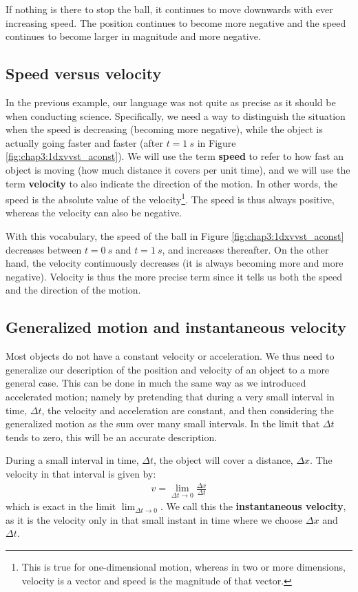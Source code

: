 If nothing is there to stop the ball, it continues to move downwards with ever increasing speed. The position continues to become more negative and the speed continues to become larger in magnitude and more negative.


\subsection{Speed versus velocity}
In the previous example, our language was not quite as precise as it should be when conducting science. Specifically, we need a way to distinguish the situation when the speed is decreasing (becoming more negative), while the object is actually going faster and faster (after $t=\SI{1}{s}$ in Figure \ref{fig:chap3:1dxvvst_aconst}). We will use the term \textbf{speed} to refer to how fast an object is moving (how much distance it covers per unit time), and we will use the term \textbf{velocity} to also indicate the direction of the motion. In other words, the speed is the absolute value of the velocity\footnote{This is true for one-dimensional motion, whereas in two or more dimensions, velocity is a vector and speed is the magnitude of that vector.}. The speed is thus always positive, whereas the velocity can also be negative.

With this vocabulary, the speed of the ball in Figure \ref{fig:chap3:1dxvvst_aconst} decreases between $t=\SI{0}{s}$ and $t=\SI{1}{s}$, and increases thereafter. On the other hand, the velocity continuously decreases (it is always becoming more and more negative). Velocity is thus the more precise term since it tells us both the speed and the direction of the motion.

\subsection{Generalized motion and instantaneous velocity}
Most objects do not have a constant velocity or acceleration. We thus need to generalize our description of the position and velocity of an object to a more general case. This can be done in much the same way as we introduced accelerated motion; namely by pretending that during a very small interval in time, $\Delta t$, the velocity and acceleration are constant, and then considering the generalized motion as the sum over many small intervals. In the limit that $\Delta t$ tends to zero, this will be an accurate description. 

During a small interval in time, $\Delta t$, the object will cover a distance, $\Delta x$. The velocity in that interval is given by:
\begin{align*}
v = \lim_{\Delta t\to 0} \frac{\Delta x}{\Delta t}
\end{align*}
which is exact in the limit $\lim_{\Delta t\to 0}$. We call this the \textbf{instantaneous velocity}, as it is the velocity only in that small instant in time where we choose $\Delta x$ and $\Delta t$.

